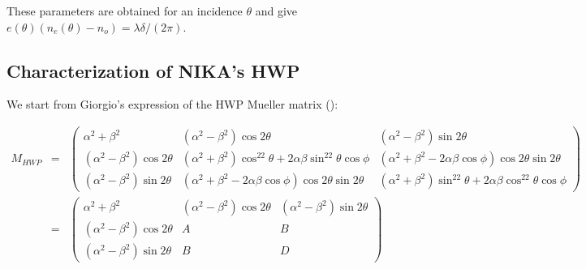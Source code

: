 \documentclass[a4paper,10pt]{article}
\begin{document}
These parameters are obtained for an incidence $\theta$ and give
$e(\theta)(n_e(\theta)-n_o) = \lambda\delta/(2\pi)$.


\subsection{Characterization of NIKA's HWP}

We start from Giorgio's expression of the HWP Mueller matrix
(\cite{giorgio_hwp}):


\begin{eqnarray}
M_{HWP} &=& \left(\begin{array}{lll}
\alpha^2+\beta^2              & (\alpha^2-\beta^2)\cos2\theta & (\alpha^2-\beta^2)\sin2\theta \\
(\alpha^2-\beta^2)\cos2\theta & (\alpha^2+\beta^2)\cos^22\theta +
2\alpha\beta\sin^22\theta\cos\phi &
(\alpha^2+\beta^2-2\alpha\beta\cos\phi)\cos2\theta\sin2\theta \\
(\alpha^2-\beta^2)\sin2\theta &
(\alpha^2+\beta^2-2\alpha\beta\cos\phi)\cos2\theta\sin2\theta &
(\alpha^2+\beta^2)\sin^22\theta + 2\alpha\beta\cos^22\theta\cos\phi
\end{array}\right)\label{eq:hwp_giorgio}\\
&=&
\left(\begin{array}{lll}
\alpha^2+\beta^2              & (\alpha^2-\beta^2)\cos2\theta & (\alpha^2-\beta^2)\sin2\theta \\
(\alpha^2-\beta^2)\cos2\theta & A & B \\
(\alpha^2-\beta^2)\sin2\theta & B & D\end{array}\right)
\end{eqnarray}
\end{document}
